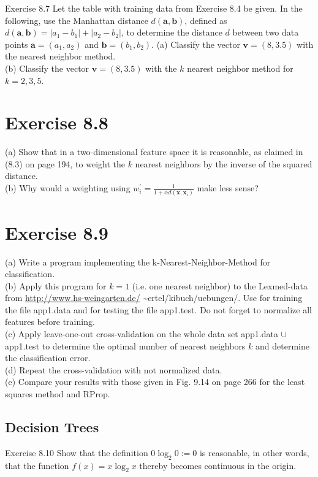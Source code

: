 \documentclass[10pt]{book}
\begin{document}
Exercise 8.7 Let the table with training data from Exercise 8.4 be given. In the following, use the Manhattan distance $d(\boldsymbol{a}, \boldsymbol{b})$, defined as $d(\boldsymbol{a}, \boldsymbol{b})=\left|a_{1}-b_{1}\right|+\left|a_{2}-b_{2}\right|$, to determine the distance $d$ between two data points $\boldsymbol{a}=\left(a_{1}, a_{2}\right)$ and $\boldsymbol{b}=\left(b_{1}, b_{2}\right)$.
(a) Classify the vector $\boldsymbol{v}=(8,3.5)$ with the nearest neighbor method.\\
(b) Classify the vector $\boldsymbol{v}=(8,3.5)$ with the $k$ nearest neighbor method for $k=2,3,5$.

\section{Exercise 8.8}
(a) Show that in a two-dimensional feature space it is reasonable, as claimed in (8.3) on page 194, to weight the $k$ nearest neighbors by the inverse of the squared distance.\\
(b) Why would a weighting using $w_{i}^{\prime}=\frac{1}{1+\alpha d\left(\boldsymbol{x}, \boldsymbol{x}_{i}\right)}$ make less sense?

\section{Exercise 8.9}
(a) Write a program implementing the k-Nearest-Neighbor-Method for classification.\\
(b) Apply this program for $k=1$ (i.e. one nearest neighbor) to the Lexmed-data from \href{http://www.hs-weingarten.de/}{http://www.hs-weingarten.de/} \~{}ertel/kibuch/uebungen/. Use for training the file app1.data and for testing the file app1.test. Do not forget to normalize all features before training.\\
(c) Apply leave-one-out cross-validation on the whole data set app1.data $\cup$ app1.test to determine the optimal number of nearest neighbors $k$ and determine the classification error.\\
(d) Repeat the cross-validation with not normalized data.\\
(e) Compare your results with those given in Fig. 9.14 on page 266 for the least squares method and RProp.

\subsection{Decision Trees}
Exercise 8.10 Show that the definition $0 \log _{2} 0:=0$ is reasonable, in other words, that the function $f(x)=x \log _{2} x$ thereby becomes continuous in the origin.
\end{document}
